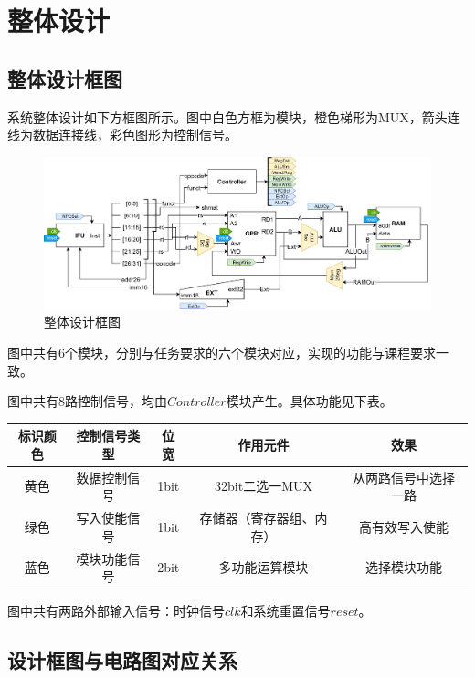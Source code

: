 \documentclass[main.tex]{subfiles}
\begin{document}
\section{整体设计}
\subsection{整体设计框图}
系统整体设计如下方框图所示。图中白色方框为模块，橙色梯形为MUX，箭头连线为数据连接线，彩色图形为控制信号。
\begin{figure}[h]
\centering
\includegraphics[width=\textwidth]{images/PCOA-overall-block.png}
\caption{整体设计框图}
\end{figure}

图中共有$6$个模块，分别与任务要求的六个模块对应，实现的功能与课程要求一致。

图中共有$8$路控制信号，均由$Controller$模块产生。具体功能见下表。

\begin{center}
    \begin{tabular}{c c c c c}
        \toprule
        标识颜色 & 控制信号类型 & 位宽 & 作用元件 & 效果\\
        \midrule
         黄色 & 数据控制信号 & 1bit & 32bit二选一MUX & 从两路信号中选择一路 \\
         绿色 & 写入使能信号 & 1bit & 存储器（寄存器组、内存） & 高有效写入使能 \\
         蓝色 & 模块功能信号 & 2bit & 多功能运算模块 & 选择模块功能 \\
        \bottomrule
    \end{tabular}
\end{center}

图中共有两路外部输入信号：时钟信号$clk$和系统重置信号$reset$。

\clearpage

\subsection{设计框图与电路图对应关系}
\end{document}

